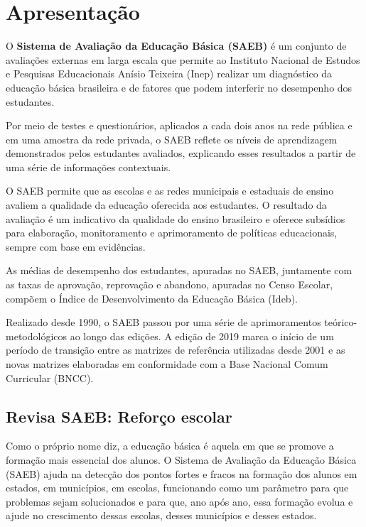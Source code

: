 
\chapter{Apresentação}

O \textbf{Sistema de Avaliação da Educação Básica (SAEB)} é um conjunto
de avaliações externas em larga escala que permite ao Instituto Nacional
de Estudos e Pesquisas Educacionais Anísio Teixeira (Inep) realizar um
diagnóstico da educação básica brasileira e de fatores que podem
interferir no desempenho dos estudantes.

Por meio de testes e questionários, aplicados a cada dois anos na rede
pública e em uma amostra da rede privada, o SAEB reflete os níveis de
aprendizagem demonstrados pelos estudantes avaliados, explicando esses
resultados a partir de uma série de informações contextuais.

O SAEB permite que as escolas e as redes municipais e estaduais de
ensino avaliem a qualidade da educação oferecida aos estudantes. O
resultado da avaliação é um indicativo da qualidade do ensino brasileiro
e oferece subsídios para elaboração, monitoramento e aprimoramento de
políticas educacionais, sempre com base em evidências.

As médias de desempenho dos estudantes, apuradas no SAEB, juntamente com
as taxas de aprovação, reprovação e abandono, apuradas no Censo Escolar,
compõem o Índice de Desenvolvimento da Educação Básica (Ideb).

Realizado desde 1990, o SAEB passou por uma série de aprimoramentos
teórico-metodológicos ao longo das edições. A edição de 2019 marca o
início de um período de transição entre as matrizes de referência
utilizadas desde 2001 e as novas matrizes elaboradas em conformidade com
a Base Nacional Comum Curricular (BNCC).

\section{Revisa SAEB: Reforço escolar}

Como o próprio nome diz, a educação básica é aquela em que se promove a
formação mais essencial dos alunos. O Sistema de Avaliação da Educação
Básica (SAEB) ajuda na detecção dos pontos fortes e fracos na formação
dos alunos em estados, em municípios, em escolas, funcionando como um
parâmetro para que problemas sejam solucionados e para que, ano após
ano, essa formação evolua e ajude no crescimento dessas escolas, desses
municípios e desses estados.

